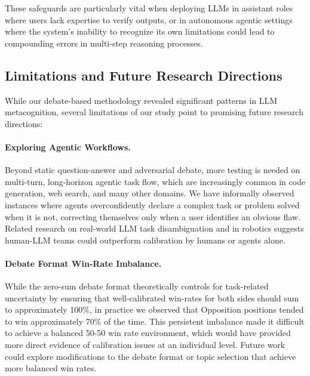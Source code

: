 \documentclass{article}
\begin{document}
These safeguards are particularly vital when deploying LLMs in assistant roles where users lack expertise to verify outputs, or in autonomous agentic settings where the system's inability to recognize its own limitations could lead to compounding errors in multi-step reasoning processes.

\subsection{Limitations and Future Research Directions}
\label{subsec:limitations_future}

While our debate-based methodology revealed significant patterns in LLM metacognition, several limitations of our study point to promising future research directions:

\paragraph{Exploring Agentic Workflows.} Beyond static question-answer and adversarial debate, more testing is needed on multi-turn, long-horizon agentic task flow, which are increasingly common in code generation, web search, and many other domains. We have informally observed instances where agents overconfidently declare a complex task or problem solved when it is not, correcting themselves only when a user identifies an obvious flaw. Related research on real-world LLM task disambiguation \citep{hu2024uncertaintythoughtsuncertaintyawareplanning,kobalczyk2025activetaskdisambiguationllms} and in robotics \citep{liang2025introspectiveplanningaligningrobots,ren2023robotsaskhelpuncertainty} suggests human-LLM teams could outperform calibration by humans or agents alone.

\paragraph{Debate Format Win-Rate Imbalance.} While the zero-sum debate format theoretically controls for task-related uncertainty by ensuring that well-calibrated win-rates for both sides should sum to approximately 100\%, in practice we observed that Opposition positions tended to win approximately 70\% of the time. This persistent imbalance made it difficult to achieve a balanced 50-50 win rate environment, which would have provided more direct evidence of calibration issues at an individual level. Future work could explore modifications to the debate format or topic selection that achieve more balanced win rates.
\end{document}
